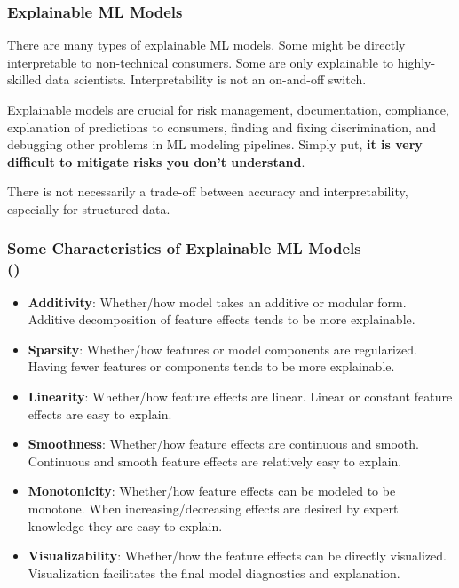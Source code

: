\documentclass[11pt,aspectratio=169,hyperref={colorlinks}]{beamer}
\begin{document}
		\begin{frame}
	
			\frametitle{Explainable ML Models}			
	
			\small
			
			There are many types of explainable ML models. Some might be directly interpretable to non-technical consumers. Some are only explainable to highly-skilled data scientists. Interpretability is not an on-and-off switch.
			
			\vspace{10pt}
			
			Explainable models are crucial for risk management, documentation, compliance, explanation of predictions to consumers, finding and fixing discrimination, and  debugging other problems in ML modeling pipelines. Simply put, \textbf{it is very difficult to mitigate risks you don't understand}.
			
			\vspace{10pt}
			
			There is not necessarily a trade-off between accuracy and interpretability, especially for structured data.
			
			\normalsize
			
		\end{frame}	

		\begin{frame}
	
			\frametitle{Some Characteristics of Explainable ML Models\\ (\small{\cite{sudjianto2021designing})}}			
			
			\small
			
			\begin{itemize}
				\item \textbf{Additivity}: Whether/how model takes an additive or modular form. Additive decomposition of feature effects tends to be more explainable.
				\item \textbf{Sparsity}: Whether/how features or model components are regularized. Having fewer features or components tends to be more explainable.
				\item \textbf{Linearity}: Whether/how feature effects are linear. Linear or constant feature effects are easy to explain.
				\item \textbf{Smoothness}: Whether/how feature effects are continuous and smooth. Continuous and smooth feature effects are relatively easy to explain.
				\item \textbf{Monotonicity}: Whether/how feature effects can be modeled to be monotone. When increasing/decreasing effects are desired by expert knowledge they are easy to explain.
				\item \textbf{Visualizability}: Whether/how the feature effects can be directly visualized. Visualization facilitates the final model diagnostics and explanation.
			\end{itemize}
			
			\normalsize
			
		\end{frame}	
\end{document}
